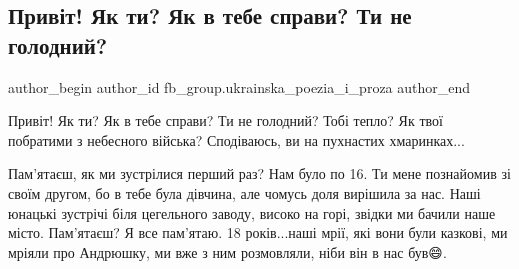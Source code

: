  
 
 
 
 

\subsection{Привіт! Як ти? Як в тебе справи? Ти не голодний?}
\label{sec:06_01_2023.fb.fb_group.ukrainska_poezia_i_proza.1.priv_t__yak_ti__yak_}

\ifcmt
 author_begin
   author_id fb_group.ukrainska_poezia_i_proza
 author_end
\fi

Привіт! Як ти? Як в тебе справи? Ти не голодний? Тобі тепло? Як твої побратими
з небесного війська? Сподіваюсь, ви на пухнастих хмаринках...

Пам'ятаєш, як ми зустрілися перший раз? Нам було по 16. Ти мене познайомив зі
своїм другом, бо в тебе була дівчина, але чомусь доля вирішила за нас. Наші
юнацькі зустрічі біля цегельного заводу, високо на горі, звідки ми бачили наше
місто. Пам'ятаєш? Я все пам'ятаю. 18 років...наші мрії, які вони були казкові,
ми мріяли про Андрюшку, ми вже з ним розмовляли, ніби він в нас був😄.

